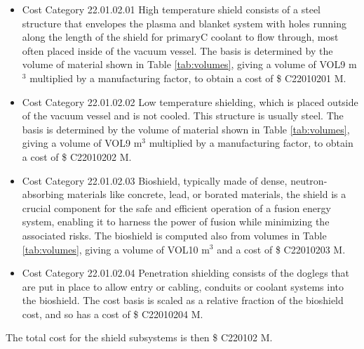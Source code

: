 \begin{itemize}
    \item Cost Category 22.01.02.01 High temperature shield consists of a steel structure that envelopes the plasma and blanket system with holes running along the length of the shield for primaryC coolant to flow through, most often placed inside of the vacuum vessel. The basis is determined by the volume of material shown in Table \ref{tab:volumes}, giving a volume of VOL9  m$^{3}$ multiplied by a manufacturing factor, to obtain a cost of \$ C22010201 M. %
    \item Cost Category 22.01.02.02 Low temperature shielding, which is placed outside of the vacuum vessel and is not cooled.  This structure is usually steel.  The basis is determined by the volume of material shown in Table \ref{tab:volumes}, giving a volume of VOL9  m$^{3}$ multiplied by a manufacturing factor, to obtain a cost of \$ C22010202 M.
    \item Cost Category 22.01.02.03 Bioshield, typically made of dense, neutron-absorbing materials like concrete, lead, or borated materials, the shield is a crucial component for the safe and efficient operation of a fusion energy system, enabling it to harness the power of fusion while minimizing the associated risks.  The bioshield is computed also from volumes in Table \ref{tab:volumes}, giving a volume of VOL10 m$^{3}$ and a cost of \$ C22010203 M. 
    \item Cost Category 22.01.02.04 Penetration shielding consists of the doglegs that are put in place to allow entry or cabling, conduits or coolant systems into the bioshield.  The cost basis is scaled as a relative fraction of the bioshield cost, and so has a cost of \$ C22010204 M.
\end{itemize}

The total cost for the shield subsystems is then \$ C220102 M.




